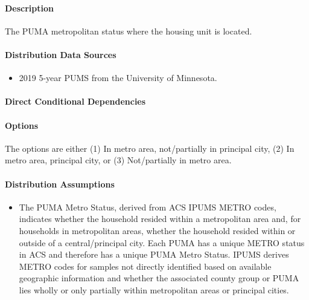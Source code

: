 \paragraph{Description}
% 
The PUMA metropolitan status where the housing unit is located.

\paragraph{Distribution Data Sources}
% 
\begin{itemize}
    \item 2019 5-year PUMS from the University of Minnesota.
\end{itemize}

\paragraph{Direct Conditional Dependencies}


\paragraph{Options}
The options are either (1) In metro area, not/partially in principal city, (2) In metro area, principal city, or (3) Not/partially in metro area.

\paragraph{Distribution Assumptions}
% 
\begin{itemize}
    \item The PUMA Metro Status, derived from ACS IPUMS METRO codes, indicates whether the household resided within a metropolitan area and, for households in metropolitan areas, whether the household resided within or outside of a central/principal city. Each PUMA has a unique METRO status in ACS and therefore has a unique PUMA Metro Status. IPUMS derives METRO codes for samples not directly identified based on available geographic information and whether the associated county group or PUMA lies wholly or only partially within metropolitan areas or principal cities.
\end{itemize}

